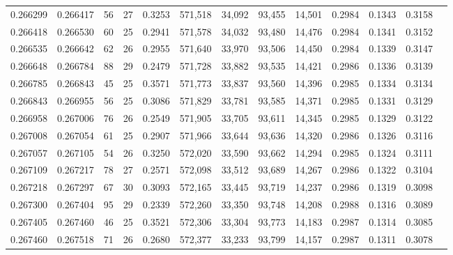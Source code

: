 \begin{tabular}{rrrrrrrrrrrrr}
0.266299 & 0.266417 &  56 &  27 &                                     0.3253 & 571,518 &  34,092 &  93,455 &  14,501 & 0.2984 & 0.1343 & 0.3158 \\
0.266418 & 0.266530 &  60 &  25 &                                     0.2941 & 571,578 &  34,032 &  93,480 &  14,476 & 0.2984 & 0.1341 & 0.3152 \\
0.266535 & 0.266642 &  62 &  26 &                                     0.2955 & 571,640 &  33,970 &  93,506 &  14,450 & 0.2984 & 0.1339 & 0.3147 \\
0.266648 & 0.266784 &  88 &  29 &                                     0.2479 & 571,728 &  33,882 &  93,535 &  14,421 & 0.2986 & 0.1336 & 0.3139 \\
0.266785 & 0.266843 &  45 &  25 &                                     0.3571 & 571,773 &  33,837 &  93,560 &  14,396 & 0.2985 & 0.1334 & 0.3134 \\
0.266843 & 0.266955 &  56 &  25 &                                     0.3086 & 571,829 &  33,781 &  93,585 &  14,371 & 0.2985 & 0.1331 & 0.3129 \\
0.266958 & 0.267006 &  76 &  26 &                                     0.2549 & 571,905 &  33,705 &  93,611 &  14,345 & 0.2985 & 0.1329 & 0.3122 \\
0.267008 & 0.267054 &  61 &  25 &                                     0.2907 & 571,966 &  33,644 &  93,636 &  14,320 & 0.2986 & 0.1326 & 0.3116 \\
0.267057 & 0.267105 &  54 &  26 &                                     0.3250 & 572,020 &  33,590 &  93,662 &  14,294 & 0.2985 & 0.1324 & 0.3111 \\
0.267109 & 0.267217 &  78 &  27 &                                     0.2571 & 572,098 &  33,512 &  93,689 &  14,267 & 0.2986 & 0.1322 & 0.3104 \\
0.267218 & 0.267297 &  67 &  30 &                                     0.3093 & 572,165 &  33,445 &  93,719 &  14,237 & 0.2986 & 0.1319 & 0.3098 \\
0.267300 & 0.267404 &  95 &  29 &                                     0.2339 & 572,260 &  33,350 &  93,748 &  14,208 & 0.2988 & 0.1316 & 0.3089 \\
0.267405 & 0.267460 &  46 &  25 &                                     0.3521 & 572,306 &  33,304 &  93,773 &  14,183 & 0.2987 & 0.1314 & 0.3085 \\
0.267460 & 0.267518 &  71 &  26 &                                     0.2680 & 572,377 &  33,233 &  93,799 &  14,157 & 0.2987 & 0.1311 & 0.3078 \\

\end{tabular}
